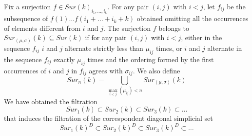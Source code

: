 	\begin{definition}
		Fix a surjection $f\in Sur(k)_{i_{1},\dots,i_{k}}$. For any pair $(i,j)$ with $i< j$, let $f_{ij}$ be the subsequence of $f(1) \dots f(i_1+\dots+i_k+k)$ obtained omitting all the occurrences of elements different from $i$ and $j$.
		The surjection $f$ belongs to $Sur_{(\mu,\sigma)}(k)\subseteq Sur(k)$ if for any pair $(i,j)$ with $i< j$, either in the sequence $f_{ij}$ $i$ and $j$ alternate strictly less than $\mu_{ij}$ times,
		 or $i$ and $j$ alternate in the sequence $f_{ij}$  exactly $\mu_{ij}$ times and the ordering formed by the first occurrences of $i$ and $j$ in $f_{ij}$ agrees with $\sigma_{ij}$. We also define \begin{equation*}
		 	\label{def}
		 	Sur_{n}(k)=\bigcup_{\max_{i<j}(\mu_{ij})< n} Sur_{(\mu,\sigma)}(k)
		 \end{equation*}
	    We have obtained the filtration $$Sur_1(k) \subset Sur_2(k)  \subset Sur_3(k)  \subset \dots $$
	    that induces the filtration of the correspondent diagonal simplicial set
	    $$Sur_1(k)^{D} \subset Sur_2(k)^{D}  \subset Sur_3(k)^{D}  \subset\dots $$

	\end{definition}

